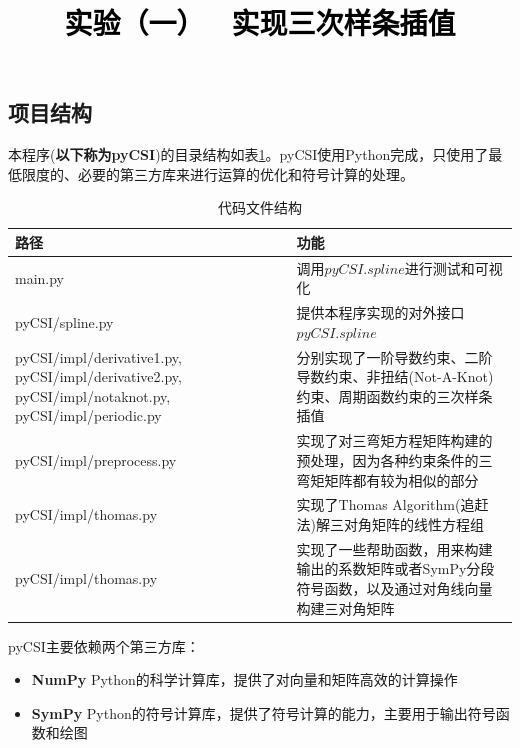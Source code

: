 \documentclass[a4paper,twoside]{article}
\newcommand{\PaperTitle}{实验（一） \ 实现三次样条插值}  %
\begin{document}
\newpage

\title{
	\Large{\textcolor{black}{\PaperTitle}}
}
	
	
\maketitle
	
\tableofcontents
 
\newpage
\begin{spacing}{1.2}

\section{项目结构}
\label{sec:struct}

本程序(\textbf{以下称为pyCSI})的目录结构如表\ref{tbl:codestruct}。pyCSI使用Python完成，只使用了最低限度的、必要的第三方库来进行运算的优化和符号计算的处理。

\begin{table}[h]
	\caption{代码文件结构}
	\label{tbl:codestruct}
	\begin{center}
		\begin{tabular}{p{5cm}p{8cm}}
			\toprule
			路径 & 功能 \\
			\midrule
			main.py & 调用$pyCSI.spline$进行测试和可视化 \\
			\hline
			pyCSI/spline.py & 提供本程序实现的对外接口$pyCSI.spline$ \\
			\hline
			pyCSI/impl/derivative1.py, pyCSI/impl/derivative2.py, pyCSI/impl/notaknot.py,  pyCSI/impl/periodic.py & 分别实现了一阶导数约束、二阶导数约束、非扭结(Not-A-Knot)约束、周期函数约束的三次样条插值 \\
			\hline
			pyCSI/impl/preprocess.py & 实现了对三弯矩方程矩阵构建的预处理，因为各种约束条件的三弯矩矩阵都有较为相似的部分 \\
			\hline
			pyCSI/impl/thomas.py & 实现了Thomas Algorithm(追赶法)解三对角矩阵的线性方程组 \\
			\hline
			pyCSI/impl/thomas.py & 实现了一些帮助函数，用来构建输出的系数矩阵或者SymPy分段符号函数，以及通过对角线向量构建三对角矩阵 \\
			\bottomrule
		\end{tabular}
	\end{center}
\end{table}

pyCSI主要依赖两个第三方库：

\begin{itemize}
	\item \textbf{NumPy} Python的科学计算库，提供了对向量和矩阵高效的计算操作
	\item \textbf{SymPy} Python的符号计算库，提供了符号计算的能力，主要用于输出符号函数和绘图
\end{itemize}


\end{spacing}
\end{document}
